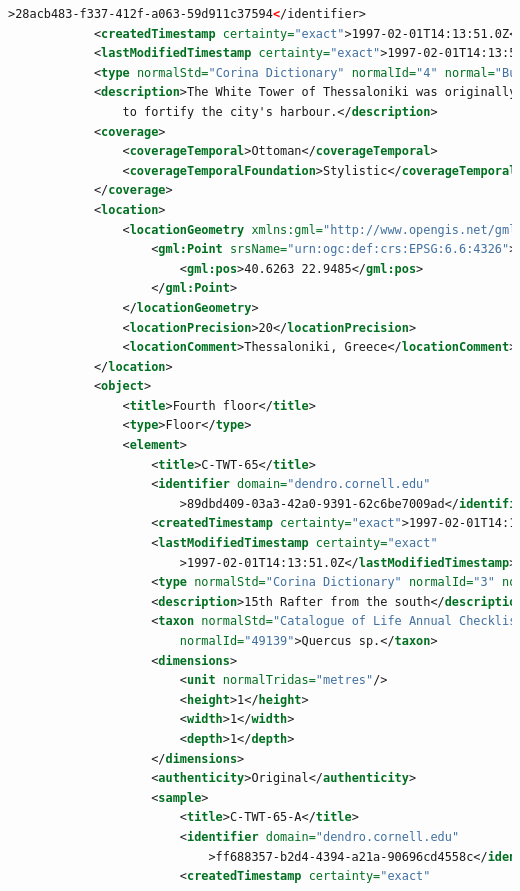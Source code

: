 \begin{lstlisting}[language=XML]
                >28acb483-f337-412f-a063-59d911c37594</identifier>
            <createdTimestamp certainty="exact">1997-02-01T14:13:51.0Z</createdTimestamp>
            <lastModifiedTimestamp certainty="exact">1997-02-01T14:13:51.0Z</lastModifiedTimestamp>
            <type normalStd="Corina Dictionary" normalId="4" normal="Building">Building</type>
            <description>The White Tower of Thessaloniki was originally constructed by the Ottomans
                to fortify the city's harbour.</description>
            <coverage>
                <coverageTemporal>Ottoman</coverageTemporal>
                <coverageTemporalFoundation>Stylistic</coverageTemporalFoundation>
            </coverage>
            <location>
                <locationGeometry xmlns:gml="http://www.opengis.net/gml">
                    <gml:Point srsName="urn:ogc:def:crs:EPSG:6.6:4326">
                        <gml:pos>40.6263 22.9485</gml:pos>
                    </gml:Point>
                </locationGeometry>
                <locationPrecision>20</locationPrecision>
                <locationComment>Thessaloniki, Greece</locationComment>
            </location>
            <object>
                <title>Fourth floor</title>
                <type>Floor</type>
                <element>
                    <title>C-TWT-65</title>
                    <identifier domain="dendro.cornell.edu"
                        >89dbd409-03a3-42a0-9391-62c6be7009ad</identifier>
                    <createdTimestamp certainty="exact">1997-02-01T14:13:51.0Z</createdTimestamp>
                    <lastModifiedTimestamp certainty="exact"
                        >1997-02-01T14:13:51.0Z</lastModifiedTimestamp>
                    <type normalStd="Corina Dictionary" normalId="3" normal="Rafter">Rafter</type>
                    <description>15th Rafter from the south</description>
                    <taxon normalStd="Catalogue of Life Annual Checklist 2008" normal="Quercus"
                        normalId="49139">Quercus sp.</taxon>
                    <dimensions>
                        <unit normalTridas="metres"/>
                        <height>1</height>
                        <width>1</width>
                        <depth>1</depth>
                    </dimensions>
                    <authenticity>Original</authenticity>
                    <sample>
                        <title>C-TWT-65-A</title>
                        <identifier domain="dendro.cornell.edu"
                            >ff688357-b2d4-4394-a21a-90696cd4558c</identifier>
                        <createdTimestamp certainty="exact"

\end{lstlisting}
